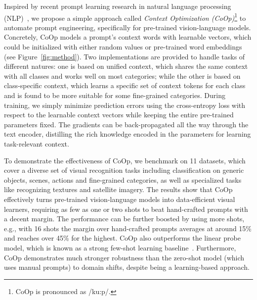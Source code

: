 Inspired by recent prompt learning research in natural language processing (NLP)~\citep{shin2020autoprompt,jiang2020can,zhong2021factual}, we propose a simple approach called \emph{Context Optimization (CoOp)}\footnote{CoOp is pronounced as /ku:p/.} to automate prompt engineering, specifically for pre-trained vision-language models. Concretely, CoOp models a prompt's context words with learnable vectors, which could be initialized with either random values or pre-trained word embeddings (see Figure~\ref{fig:method}). Two implementations are provided to handle tasks of different natures: one is based on unified context, which shares the same context with all classes and works well on most categories; while the other is based on class-specific context, which learns a specific set of context tokens for each class and is found to be more suitable for some fine-grained categories. During training, we simply minimize prediction errors using the cross-entropy loss with respect to the learnable context vectors while keeping the entire pre-trained parameters fixed. The gradients can be back-propagated all the way through the text encoder, distilling the rich knowledge encoded in the parameters for learning task-relevant context.

To demonstrate the effectiveness of CoOp, we benchmark on 11 datasets, which cover a diverse set of visual recognition tasks including classification on generic objects, scenes, actions and fine-grained categories, as well as specialized tasks like recognizing textures and satellite imagery. The results show that CoOp effectively turns pre-trained vision-language models into data-efficient visual learners, requiring as few as one or two shots to beat hand-crafted prompts with a decent margin. The performance can be further boosted by using more shots, e.g., with 16 shots the margin over hand-crafted prompts averages at around 15\% and reaches over 45\% for the highest. CoOp also outperforms the linear probe model, which is known as a strong few-shot learning baseline~\citep{tian2020rethinking}. Furthermore, CoOp demonstrates much stronger robustness than the zero-shot model (which uses manual prompts) to domain shifts, despite being a learning-based approach.

